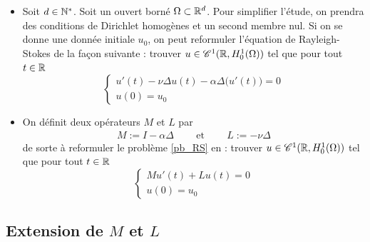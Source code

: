 \begin{frame}
    \begin{itemize}
        \item     Soit $d \in \mathbb{N}^*$. Soit un ouvert borné $\Omega \subset \mathbb{R}^d$.
Pour simplifier l'étude, on prendra des conditions de Dirichlet homogènes et un second membre nul.
Si on se donne une donnée initiale $u_0$, on peut reformuler 
l'équation de Rayleigh-Stokes de la façon suivante : trouver $u \in \mathscr{C}^1(\mathbb{R}, H^1_0(\Omega))$ 
tel que pour tout $t \in \mathbb{R}$
\begin{equation}\label{pb_RS}
\begin{cases}
    u'(t) - \nu\Delta u(t) - \alpha\Delta \big(u'(t)\big) = 0  \\
    u(0) = u_0
\end{cases}
\end{equation}
\item     On définit deux opérateurs $M$ et $L$ par
\begin{eqnarray*}
    M := I - \alpha \Delta \ \ \ \ \ &\text{ et }& \ \ \ \ \ L :=-\nu\Delta
\end{eqnarray*}
de sorte à reformuler le problème \eqref{pb_RS} en : trouver $u \in \mathscr{C}^1(\mathbb{R}, H^1_0(\Omega))$ tel que pour tout $t \in \mathbb{R}$
\begin{equation}\label{RS_forme_operateur}
\begin{cases}
    Mu'(t) + Lu(t)=0  \\
    u(0) = u_0
\end{cases}
\end{equation} 
    \end{itemize}
\end{frame}

\subsection{Extension de $M$ et $L$}

